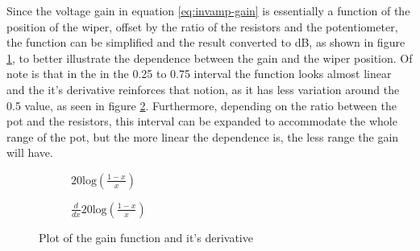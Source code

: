 Since the voltage gain in equation \ref{eq:invamp-gain} is essentially a
function of the position of the wiper, offset by the ratio of the resistors and
the potentiometer, the function can be simplified and the result converted
to dB, as shown in figure \ref{fig:invamp-gain-a}, to better illustrate the
dependence between the gain and the wiper position. Of note is that in the
in the 0.25 to 0.75 interval the function looks almost linear and the it's
derivative reinforces that notion, as it has less variation around the 0.5
value, as seen in figure \ref{fig:invamp-gain-b}. Furthermore, depending on the
ratio between the pot and the resistors, this interval can be expanded to
accommodate the whole range of the pot, but the more linear the dependence is,
the less range the gain will have.
\begin{figure}[h]
    \begin{subfigure}{0.5\textwidth}
        \caption{$20\text{log}(\frac{1-x}{x})$}
        \label{fig:invamp-gain-a}
    \end{subfigure}
    \hspace*{\fill}
    \begin{subfigure}{0.5\textwidth}
        \caption{$\frac{d}{dx}20\text{log}(\frac{1-x}{x})$}
        \label{fig:invamp-gain-b}
    \end{subfigure}
    \caption{Plot of the gain function and it's derivative}
    \label{fig:invamp-gain}
\end{figure}

